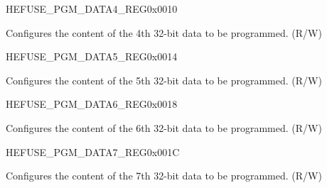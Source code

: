 \begin{register}{H}{EFUSE\_PGM\_DATA4\_REG}{0x0010}\label{regdesc:EFUSEPGMDATA4REG}
%
\regnewline%
\begin{regdesc}\begin{reglist}
\label{fielddesc:EFUSEPGMDATA4}\item [EFUSE\_PGM\_DATA\_4] Configures the content of the 4th 32-bit data to be programmed. (R/W)
\end{reglist}\end{regdesc}
\end{register}


\begin{register}{H}{EFUSE\_PGM\_DATA5\_REG}{0x0014}\label{regdesc:EFUSEPGMDATA5REG}
%
\regnewline%
\begin{regdesc}\begin{reglist}
\label{fielddesc:EFUSEPGMDATA5}\item [EFUSE\_PGM\_DATA\_5] Configures the content of the 5th 32-bit data to be programmed. (R/W)
\end{reglist}\end{regdesc}
\end{register}


\begin{register}{H}{EFUSE\_PGM\_DATA6\_REG}{0x0018}\label{regdesc:EFUSEPGMDATA6REG}
%
\regnewline%
\begin{regdesc}\begin{reglist}
\label{fielddesc:EFUSEPGMDATA6}\item [EFUSE\_PGM\_DATA\_6] Configures the content of the 6th 32-bit data to be programmed. (R/W)
\end{reglist}\end{regdesc}
\end{register}


\begin{register}{H}{EFUSE\_PGM\_DATA7\_REG}{0x001C}\label{regdesc:EFUSEPGMDATA7REG}
%
\regnewline%
\begin{regdesc}\begin{reglist}
\label{fielddesc:EFUSEPGMDATA7}\item [EFUSE\_PGM\_DATA\_7] Configures the content of the 7th 32-bit data to be programmed. (R/W)
\end{reglist}\end{regdesc}
\end{register}


